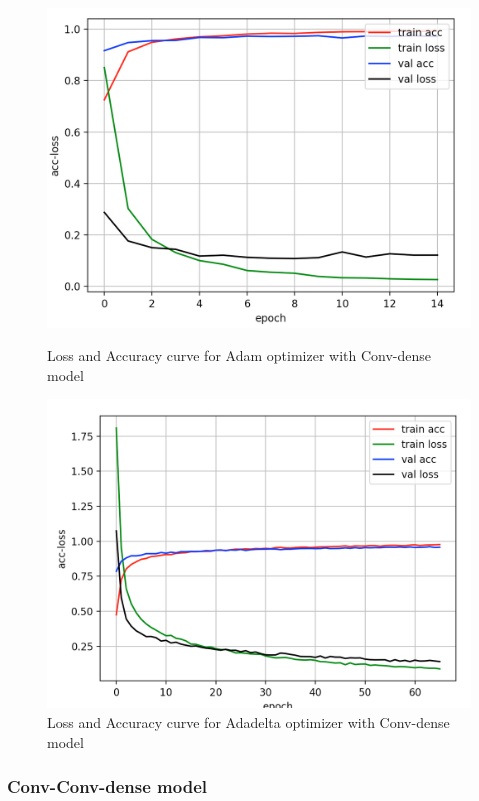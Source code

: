 \documentclass{article}
\begin{document}
\begin{figure}[htbp]
\centering
\begin{minipage}[t]{0.48\textwidth}
\centering
\includegraphics[scale = 0.3]{adam_2.png}
\caption{Loss and Accuracy curve for Adam optimizer with Conv-dense model}
\end{minipage}
\begin{minipage}[t]{0.48\textwidth}
\centering
\includegraphics[scale = 0.3]{adadelta_2.png}
\caption{Loss and Accuracy curve for Adadelta optimizer with Conv-dense model}
\end{minipage}
\end{figure}

\subsubsection*{Conv-Conv-dense model}
\end{document}
